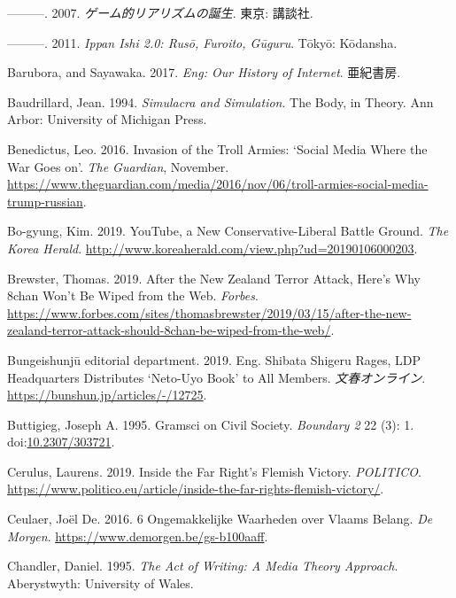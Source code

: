 \documentclass[10pt,british,A4paper,,openany]{memoir}
\begin{document}
\hypertarget{ref-azuma__2007}{}
---------. 2007. \emph{ゲーム的リアリズムの誕生}. 東京: 講談社.

\hypertarget{ref-azuma_ippan_2011}{}
---------. 2011. \emph{Ippan Ishi 2.0: Rusō, Furoito, Gūguru}. Tōkyō:
Kōdansha.

\hypertarget{ref-barubora_eng:_2017}{}
Barubora, and Sayawaka. 2017. \emph{Eng: Our History of Internet}.
亜紀書房.

\hypertarget{ref-baudrillard_simulacra_1994}{}
Baudrillard, Jean. 1994. \emph{Simulacra and Simulation}. The Body, in
Theory. Ann Arbor: University of Michigan Press.

\hypertarget{ref-benedictus_invasion_2016}{}
Benedictus, Leo. 2016. Invasion of the Troll Armies: `Social Media Where
the War Goes on'. \emph{The Guardian}, November.
\url{https://www.theguardian.com/media/2016/nov/06/troll-armies-social-media-trump-russian}.

\hypertarget{ref-bo-gyung_youtube_2019}{}
Bo-gyung, Kim. 2019. YouTube, a New Conservative-Liberal Battle Ground.
\emph{The Korea Herald}.
\url{http://www.koreaherald.com/view.php?ud=20190106000203}.

\hypertarget{ref-brewster_after_2019}{}
Brewster, Thomas. 2019. After the New Zealand Terror Attack, Here's Why
8chan Won't Be Wiped from the Web. \emph{Forbes}.
\url{https://www.forbes.com/sites/thomasbrewster/2019/03/15/after-the-new-zealand-terror-attack-should-8chan-be-wiped-from-the-web/}.

\hypertarget{ref-bungeishunju_editorial_department_eng._2019}{}
Bungeishunjū editorial department. 2019. Eng. Shibata Shigeru Rages, LDP
Headquarters Distributes `Neto-Uyo Book' to All Members.
\emph{文春オンライン}. \url{https://bunshun.jp/articles/-/12725}.

\hypertarget{ref-buttigieg_gramsci_1995}{}
Buttigieg, Joseph A. 1995. Gramsci on Civil Society. \emph{Boundary 2}
22 (3): 1. doi:\href{https://doi.org/10.2307/303721}{10.2307/303721}.

\hypertarget{ref-cerulus_inside_2019}{}
Cerulus, Laurens. 2019. Inside the Far Right's Flemish Victory.
\emph{POLITICO}.
\url{https://www.politico.eu/article/inside-the-far-rights-flemish-victory/}.

\hypertarget{ref-ceulaer_6_2016}{}
Ceulaer, Joël De. 2016. 6 Ongemakkelijke Waarheden over Vlaams Belang.
\emph{De Morgen}. \url{https://www.demorgen.be/gs-b100aaff}.

\hypertarget{ref-chandler_act_1995}{}
Chandler, Daniel. 1995. \emph{The Act of Writing: A Media Theory
Approach}. Aberystwyth: University of Wales.
\end{document}
